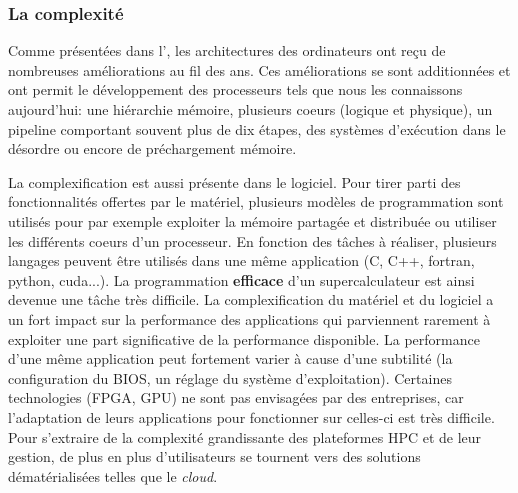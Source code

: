     \subsubsection{La complexité}\label{sec:edl_chal_complexite}
        
        Comme présentées dans l', les architectures des ordinateurs ont reçu de nombreuses améliorations au fil des ans. Ces améliorations se sont additionnées et ont permit le développement des processeurs tels que nous les connaissons aujourd'hui: une hiérarchie mémoire, plusieurs coeurs (logique et physique), un pipeline comportant souvent plus de dix étapes, des systèmes d'exécution dans le désordre ou encore de préchargement mémoire. 
        
        La complexification est aussi présente dans le logiciel. Pour tirer parti des fonctionnalités offertes par le matériel, plusieurs modèles de programmation sont utilisés pour par exemple exploiter la mémoire partagée et distribuée ou utiliser les différents coeurs d'un processeur. En fonction des tâches à réaliser, plusieurs langages peuvent être utilisés dans une même application (C, C++, fortran, python, cuda...). La programmation \textbf{efficace} d'un supercalculateur est ainsi devenue une tâche très difficile. La complexification du matériel et du logiciel a un fort impact sur la performance des applications qui parviennent rarement à exploiter une part significative de la performance disponible. La performance d’une même application peut fortement varier à cause d’une subtilité (la configuration du BIOS, un réglage du système d’exploitation). Certaines technologies (FPGA, GPU) ne sont pas envisagées par des entreprises, car l'adaptation de leurs applications pour fonctionner sur celles-ci est très difficile. Pour s'extraire de la complexité grandissante des plateformes HPC et de leur gestion, de plus en plus d'utilisateurs se tournent vers des solutions dématérialisées telles que le \textit{cloud}.
        
        
